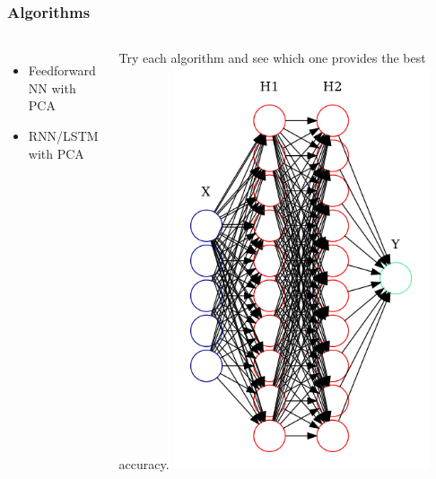 \documentclass{beamer}
\begin{document}
\begin{frame}
	\frametitle{Algorithms}
	\begin{columns}
		\begin{itemize}
			\item
				Feedforward NN with PCA
			\item
				RNN/LSTM with PCA
		\end{itemize}

		Try each algorithm and see which one provides the best accuracy.
		\includegraphics[width=0.75\textwidth]{images/nngraph.png}
	\end{columns}
\end{frame}
\end{document}
